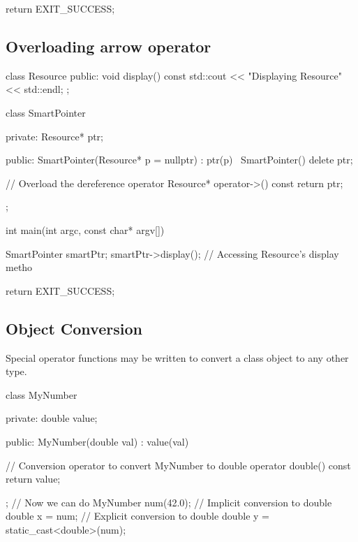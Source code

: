 \documentclass{report}
\begin{document}
\begin{concept}
\begin{cppcode}
{    return EXIT_SUCCESS;
}
    \end{cppcode}
    \bigbreak \noindent 
    \subsection{Overloading arrow operator}
    \bigbreak \noindent 
    \begin{cppcode}
class Resource {
public:
    void display() const { std::cout << "Displaying Resource" << std::endl; }
};

class SmartPointer {
private:
    Resource* ptr;

public:
    SmartPointer(Resource* p = nullptr) : ptr(p) {}
    ~SmartPointer() { delete ptr; }

    // Overload the dereference operator
    Resource* operator->() const { return ptr; }
};

int main(int argc, const char* argv[]) {
     SmartPointer smartPtr;
    smartPtr->display();  // Accessing Resource's display metho
    
    return EXIT_SUCCESS;
}
    \end{cppcode}

    \bigbreak \noindent 
    \subsection{Object Conversion}
    \bigbreak \noindent 
    \begin{concept}
        Special operator functions may be written to convert a class object to any other type.
    \end{concept}
    \bigbreak \noindent 
    \begin{cppcode}
        class MyNumber {
        private:
            double value;

        public:
            MyNumber(double val) : value(val) {}

            // Conversion operator to convert MyNumber to double
            operator double() const {
                return value;
            }
        };
        // Now we can do
        MyNumber num(42.0);
        // Implicit conversion to double
        double x = num;
        // Explicit conversion to double
        double y = static_cast<double>(num);
    \end{cppcode}
    





\end{concept}
\end{document}
